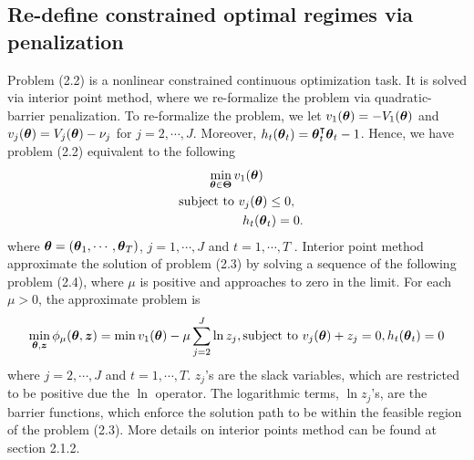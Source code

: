 \subsection{Re-define constrained optimal regimes via penalization}
Problem (2.2) is a nonlinear constrained continuous optimization task. It is solved via interior point method, where we re-formalize  the problem via quadratic-barrier penalization. To re-formalize the problem, we let $v_1(\boldsymbol{\theta}) = -V_1(\boldsymbol{\theta})$ and $v_j(\boldsymbol{\theta}) = V_j(\boldsymbol{\theta}) - \nu_j$ for $j = 2, \cdots, J$. Moreover, $h_t(\boldsymbol{\theta}_t) = \boldsymbol{\theta}_t^{\intercal}\boldsymbol{\theta}_t - 1$. Hence, we have problem (2.2) equivalent to the following
\begin{equation}
\begin{gathered}
\min_{\boldsymbol{\theta} \in \boldsymbol{\Theta}} v_1(\boldsymbol{\theta})\\
\text{subject to } v_j(\boldsymbol{\theta}) \le 0, \\
\hspace{2.0cm}h_t(\boldsymbol{\theta}_t) = 0.
\end{gathered}
\end{equation}
where $\boldsymbol{\theta} = (\boldsymbol{\theta}_1, \cdots, \boldsymbol{\theta}_T)$, $j =1, \cdots, J$ and $t = 1, \cdots, T$ . Interior point method approximate the solution of problem (2.3) by solving a sequence of the following problem (2.4), where $\mu$ is positive and approaches to zero in the limit. For each $\mu > 0$, the approximate problem is 
\begin{equation}
\min_{\boldsymbol{\theta}, \boldsymbol{z}} \phi_{\mu}(\boldsymbol{\theta}, \boldsymbol{z}) = \min v_1(\boldsymbol{\theta}) - \mu \sum_{j=2}^J \ln z_j, \text{subject to}\,\, v_j(\boldsymbol{\theta}) +z_j = 0, h_t(\boldsymbol{\theta}_t) = 0
\end{equation}
where $j=2, \cdots, J$ and $t = 1, \cdots, T$. $z_j$'s are the slack variables, which are restricted to be positive due the $\ln$ operator. The logarithmic terms, $\ln z_j$'s, are the barrier functions, which enforce the solution path to be within the feasible region of the problem (2.3). More details on interior points method can be found at section 2.1.2. \\

